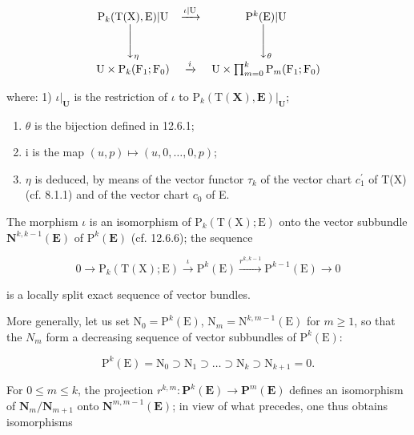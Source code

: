 \[
\begin{array}{c c c} \mathrm{P} _ {k} (\mathrm{T} (\mathrm{X}), \mathrm{E}) | \mathrm{U} & \xrightarrow {\iota | \mathrm{U}} & \mathrm{P} ^ {k} (\mathrm{E}) | \mathrm{U} \\ \Biggl \downarrow_ {\eta} & & \Biggl \downarrow_ {\theta} \\ \mathrm{U} \times \mathrm{P} _ {k} (\mathrm{F} _ {1}; \mathrm{F} _ {0}) & \xrightarrow {i} & \mathrm{U} \times \prod_ {m = 0} ^ {k} \mathrm{P} _ {m} (\mathrm{F} _ {1}; \mathrm{F} _ {0}) \end{array}
\]

where: 1) \(\iota|_{\mathbf{U}}\) is the restriction of \(\iota\) to \(\mathrm{P}_{k}(\mathrm{T}(\mathbf{X}),\mathbf{E})|_{\mathbf{U}}\);

\begin{enumerate}
\def\labelenumi{\arabic{enumi})}
\setcounter{enumi}{1}
\item
  \(\theta\) is the bijection defined in 12.6.1;
\item
  i is the map \((u, p) \mapsto (u, 0, \ldots, 0, p)\);
\item
  \(\eta\) is deduced, by means of the vector functor \(\tau_{k}\) of the vector chart \(c_{1}^{\prime}\) of T(X) (cf. 8.1.1) and of the vector chart \(c_{0}\) of E.
\end{enumerate}

The morphism \(\iota\) is an isomorphism of \(\mathrm{P}_{k}(\mathrm{T}(\mathrm{X});\mathrm{E})\) onto the vector subbundle \(\mathbf{N}^{k,k - 1}(\mathbf{E})\) of \(\mathrm{P}^k (\mathbf{E})\) (cf. 12.6.6); the sequence

\[
0 \rightarrow \mathrm{P}_{k}(\mathrm{T}(\mathrm{X});\mathrm{E}) \xrightarrow {\iota} \mathrm{P}^{k}(\mathrm{E}) \xrightarrow {r^{k,k-1}} \mathrm{P}^{k-1}(\mathrm{E}) \rightarrow 0
\]

is a locally split exact sequence of vector bundles.

More generally, let us set \(\mathrm{N}_{0}=\mathrm{P}^{k}(\mathrm{E})\), \(\mathrm{N}_{m}=\mathrm{N}^{k,m-1}(\mathrm{E})\) for \(m\geqslant1\), so that the \(N_{m}\) form a decreasing sequence of vector subbundles of \(\mathrm{P}^{k}(\mathrm{E})\):

\[
\mathrm{P} ^ {k} (\mathrm{E}) = \mathrm{N} _ {0} \supset \mathrm{N} _ {1} \supset \dots \supset \mathrm{N} _ {k} \supset \mathrm{N} _ {k + 1} = 0.
\]

For \(0 \leqslant m \leqslant k\), the projection \(r^{k,m}: \mathbf{P}^{k}(\mathbf{E}) \to \mathbf{P}^{m}(\mathbf{E})\) defines an isomorphism of \(\mathbf{N}_{m}/\mathbf{N}_{m+1}\) onto \(\mathbf{N}^{m,m-1}(\mathbf{E})\); in view of what precedes, one thus obtains isomorphisms

